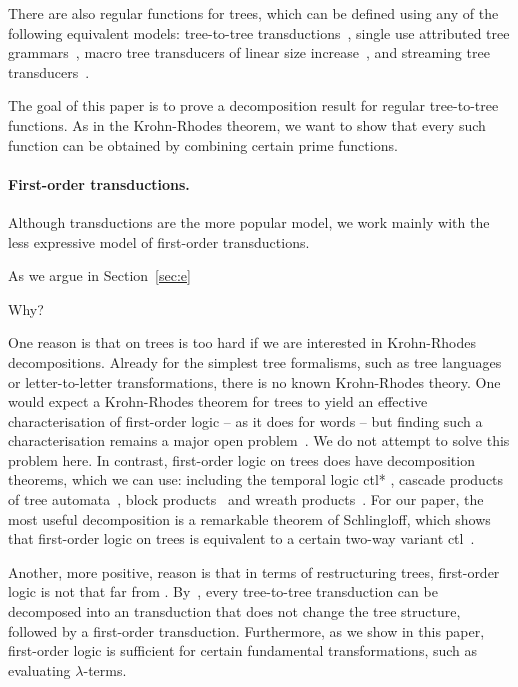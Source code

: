 There are also regular functions for trees, which can be defined using any of the following equivalent models: \mso tree-to-tree transductions~\cite[Section 3]{bloem_comparison_2000}, single use attributed tree grammars~\cite{bloem_comparison_2000}, macro tree transducers of linear size increase~\cite[Theorem 7.1]{engelfriet_macro_2003}, and streaming tree transducers~\cite[Theorem 4.6]{alur2017streaming}. 

The goal of this paper is to prove a decomposition result for regular tree-to-tree functions. As in the Krohn-Rhodes theorem, we want to show that every such function can be obtained by combining certain prime functions.  

\paragraph*{First-order transductions. } Although \mso transductions are the more popular model, we work mainly with the less expressive model of first-order transductions.

As we argue in Section~\ref{sec:e}


Why?

One reason is that \mso on trees is too hard if we are interested in Krohn-Rhodes decompositions.  Already for the simplest tree formalisms, such as tree languages or letter-to-letter transformations, there is no known  Krohn-Rhodes theory. One would expect a Krohn-Rhodes theorem  for trees to yield an effective characterisation of first-order logic -- as it does for words -- but finding such a characterisation remains a major open problem~\cite[Section 3]{bojanczyk2015automata}. We do not attempt to solve this problem here. In contrast, first-order logic on trees does have decomposition theorems, which we can use: including the temporal logic {\sc ctl*} \cite[Main Theorem]{haferthomas}, cascade products of tree automata~\cite[Theorem 2.5.7]{bojanczykDecidablePropertiesTree2004}, block products~\cite[Corollary 3.11]{esik2010algebraic} and wreath products~\cite[Theorem 3.1]{bojanczykWreathProductsForest2012}. For our paper, the most useful decomposition is a remarkable theorem of Schlingloff, which shows that first-order logic on trees is equivalent to a certain two-way variant  {\sc ctl}~\cite[Theorem 4.5]{schlingloff1992expressive}.

Another, more positive, reason is that in terms of restructuring trees, first-order logic is not that far from \mso.  By~\cite[Corollary 1]{colcombetCombinatorialTheoremTrees2007},  every \mso tree-to-tree transduction can be decomposed into an \mso transduction that does not change the tree structure, followed by a first-order transduction. Furthermore, as we show in this paper, first-order logic is sufficient for certain fundamental transformations, such as evaluating $\lambda$-terms. 



